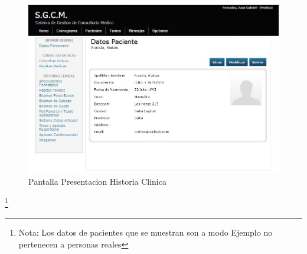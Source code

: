 \begin{figure}[H]
    \centering
    \includegraphics[scale=0.7]{resourse/sist-hist-clin.jpg}
    \caption{Pantalla Presentacion Historia Clinica}
    \label{fig:08}
\end{figure}  

\footnote{Nota: Los datos de pacientes que se muestran son a modo Ejemplo no pertenecen a personas reales}
